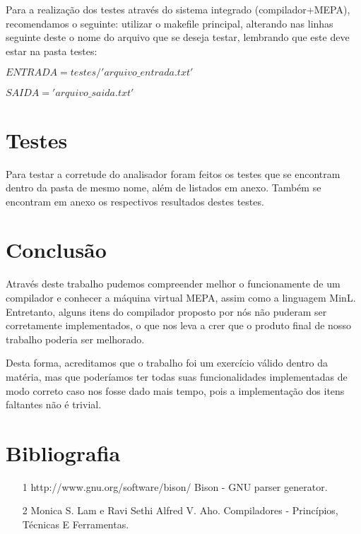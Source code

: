 \documentclass[a4paper,12pt]{article}
\begin{document}
Para a realização dos testes através do sistema integrado (compilador+MEPA), recomendamos o seguinte: utilizar o makefile principal, alterando nas linhas seguinte deste o nome do arquivo que se deseja testar, lembrando que este deve estar na pasta testes:

\textit{$ENTRADA = testes/'arquivo\_entrada.txt'$}

\textit{$SAIDA = 'arquivo\_saida.txt'$}

\section{Testes}
Para testar a corretude do analisador foram feitos os testes que se encontram dentro da pasta de mesmo nome, além de listados em anexo. Também se encontram em anexo os respectivos resultados destes testes.

\section{Conclusão}
Através deste trabalho pudemos compreender melhor o funcionamente de um compilador e conhecer a máquina virtual MEPA, assim como a linguagem MinL. Entretanto, alguns itens do compilador proposto por nós não puderam ser corretamente implementados, o que nos leva a crer que o produto final de nosso trabalho poderia ser melhorado.

Desta forma, acreditamos que o trabalho foi um exercício válido dentro da matéria, mas que poderíamos ter todas suas funcionalidades implementadas de modo correto caso nos fosse dado mais tempo, pois a implementação dos itens faltantes não é trivial.

\section{Bibliografia}
\begin{itemize}
 \item [1] http://www.gnu.org/software/bison/ Bison - GNU parser generator.
\item [2] Monica S. Lam e Ravi Sethi Alfred V. Aho. Compiladores - Princípios, Técnicas E Ferramentas.
\end{itemize}
\end{document}
